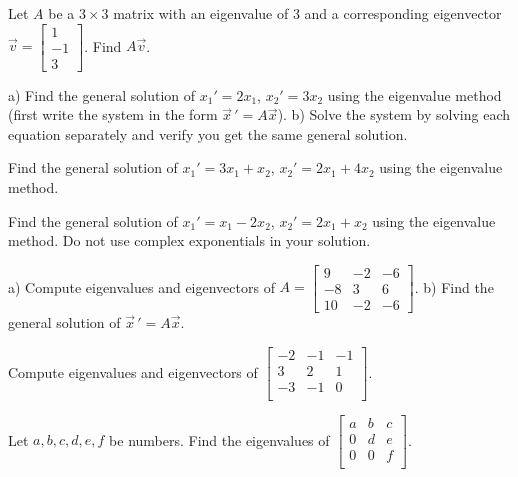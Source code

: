 \documentclass[12pt]{book}
\begin{document}
\begin{exercise}[easy]
Let $A$ be a $3 \times 3$ matrix with an eigenvalue of 3 and a
corresponding eigenvector $\vec{v} =
\left[ \begin{smallmatrix} 1 \\ -1 \\ 3 \end{smallmatrix} \right]$.
Find $A \vec{v}$.
\end{exercise}

\begin{exercise}
a) Find the general solution of $x_1' = 2 x_1$, $x_2' = 3 x_2$ using the
eigenvalue method (first write the system in the form
${\vec{x}\,}' = A \vec{x}$).  b) Solve the system by solving each equation
separately and verify you get the same general solution.
\end{exercise}

\begin{exercise}
Find the general solution of $x_1' = 3 x_1 + x_2$,
$x_2' = 2 x_1 + 4 x_2$ using the eigenvalue method.
\end{exercise}

\begin{exercise}
Find the general solution of $x_1' = x_1 -2 x_2$,
$x_2' = 2 x_1 + x_2$ using the eigenvalue method.
Do not use complex exponentials in your solution.
\end{exercise}

\begin{exercise}
a) Compute eigenvalues and eigenvectors of
$A = \left[ \begin{smallmatrix}
9 & -2 & -6 \\
-8 & 3 & 6 \\
10 & -2 & -6
\end{smallmatrix} \right]$.
b) Find the general solution of ${\vec{x}\,}' = A \vec{x}$.
\end{exercise}

\begin{exercise}
Compute eigenvalues and eigenvectors of
$\left[ \begin{smallmatrix}
-2 & -1 & -1 \\
3 & 2 & 1 \\
-3 & -1 & 0 \\
\end{smallmatrix} \right]$.
\end{exercise}

\begin{exercise}
Let $a,b,c,d,e,f$ be numbers.  Find the eigenvalues of
$\left[ \begin{smallmatrix}
a & b & c \\
0 & d & e \\
0 & 0 & f \\
\end{smallmatrix} \right]$.
\end{exercise}
\end{document}
